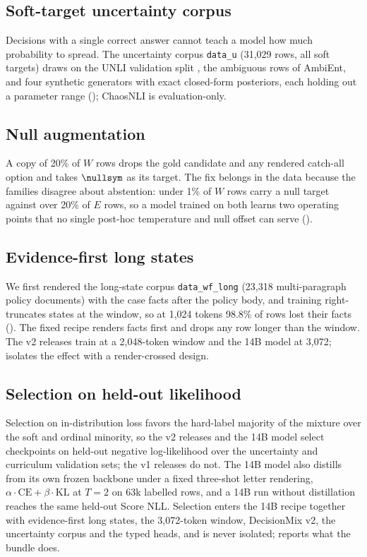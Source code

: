 \subsection{Soft-target uncertainty corpus}
\label{sec:train:uncertainty}

Decisions with a single correct answer cannot teach a model how much probability to spread. The
uncertainty corpus \texttt{data\_u} (31{,}029 rows, all soft targets) draws on the UNLI validation split
\citep{chen2020unli}, the ambiguous rows of AmbiEnt, and four synthetic generators with exact closed-form
posteriors, each holding out a parameter range (); ChaosNLI \citep{nie2020chaosnli} is
evaluation-only.

\subsection{Null augmentation}
\label{sec:train:nullaug}

A copy of 20\% of $W$ rows drops the gold candidate and any rendered catch-all option and takes $\nullsym$
as its target. The fix belongs in the data because the families disagree about abstention: under 1\% of
$W$ rows carry a null target against over 20\% of $E$ rows, so a model trained on both learns two
operating points that no single post-hoc temperature and null offset can serve
().

\subsection{Evidence-first long states}
\label{sec:train:long}

We first rendered the long-state corpus \texttt{data\_wf\_long} (23{,}318 multi-paragraph policy
documents) with the case facts after the policy body, and training right-truncates states at the window, so
at 1{,}024 tokens 98.8\% of rows lost their facts (). The fixed recipe renders
facts first and drops any row longer than the window. The v2 releases train at a 2{,}048-token window and
the 14B model at 3{,}072;  isolates the effect with a render-crossed design.

\subsection{Selection on held-out likelihood}
\label{sec:train:selection}

Selection on in-distribution loss favors the hard-label majority of the mixture over the soft and ordinal
minority, so the v2 releases and the 14B model select checkpoints on held-out negative log-likelihood over
the uncertainty and curriculum validation sets; the v1 releases do not. The 14B model also distills from
its own frozen backbone under a fixed three-shot letter rendering, $\alpha \cdot \mathrm{CE} + \beta \cdot
\mathrm{KL}$ at $T = 2$ on 63k labelled rows, and a 14B run without distillation reaches the same held-out
Score NLL. Selection enters the 14B recipe together with evidence-first long states, the 3{,}072-token
window, DecisionMix v2, the uncertainty corpus and the typed heads, and is never isolated;
 reports what the bundle does.
